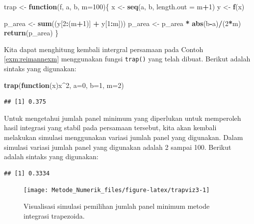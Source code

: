 \documentclass[]{book}
\newenvironment{Shaded}{\begin{snugshade}}{\end{snugshade}}
\newcommand{\ControlFlowTok}[1]{\textcolor[rgb]{0.13,0.29,0.53}{\textbf{#1}}}
\newcommand{\DataTypeTok}[1]{\textcolor[rgb]{0.13,0.29,0.53}{#1}}
\newcommand{\DecValTok}[1]{\textcolor[rgb]{0.00,0.00,0.81}{#1}}
\newcommand{\KeywordTok}[1]{\textcolor[rgb]{0.13,0.29,0.53}{\textbf{#1}}}
\newcommand{\NormalTok}[1]{#1}
\newcommand{\OperatorTok}[1]{\textcolor[rgb]{0.81,0.36,0.00}{\textbf{#1}}}
\newcommand{\StringTok}[1]{\textcolor[rgb]{0.31,0.60,0.02}{#1}}
\theoremstyle{definition}
\theoremstyle{definition}
\theoremstyle{definition}
\theoremstyle{remark}
\begin{document}
\begin{Shaded}
\begin{Highlighting}[]
\NormalTok{trap <-}\StringTok{ }\ControlFlowTok{function}\NormalTok{(f, a, b, }\DataTypeTok{m=}\DecValTok{100}\NormalTok{)\{}
\NormalTok{  x <-}\StringTok{ }\KeywordTok{seq}\NormalTok{(a, b, }\DataTypeTok{length.out =}\NormalTok{ m}\OperatorTok{+}\DecValTok{1}\NormalTok{)}
\NormalTok{  y <-}\StringTok{ }\KeywordTok{f}\NormalTok{(x)}
  
\NormalTok{  p_area <-}\StringTok{ }\KeywordTok{sum}\NormalTok{((y[}\DecValTok{2}\OperatorTok{:}\NormalTok{(m}\OperatorTok{+}\DecValTok{1}\NormalTok{)] }\OperatorTok{+}\StringTok{ }\NormalTok{y[}\DecValTok{1}\OperatorTok{:}\NormalTok{m])) }
\NormalTok{  p_area <-}\StringTok{ }\NormalTok{p_area }\OperatorTok{*}\StringTok{ }\KeywordTok{abs}\NormalTok{(b}\OperatorTok{-}\NormalTok{a)}\OperatorTok{/}\NormalTok{(}\DecValTok{2}\OperatorTok{*}\NormalTok{m)}
  \KeywordTok{return}\NormalTok{(p_area)}
\NormalTok{\}}
\end{Highlighting}
\end{Shaded}

Kita dapat menghitung kembali intergral persamaan pada Contoh \ref{exm:reimannexm} menggunakan fungsi \texttt{trap()} yang telah dibuat. Berikut adalah sintaks yang digunakan:

\begin{Shaded}
\begin{Highlighting}[]
\KeywordTok{trap}\NormalTok{(}\ControlFlowTok{function}\NormalTok{(x)x}\OperatorTok{^}\DecValTok{2}\NormalTok{, }\DataTypeTok{a=}\DecValTok{0}\NormalTok{, }\DataTypeTok{b=}\DecValTok{1}\NormalTok{, }\DataTypeTok{m=}\DecValTok{2}\NormalTok{)}
\end{Highlighting}
\end{Shaded}

\begin{verbatim}
## [1] 0.375
\end{verbatim}

Untuk mengetahui jumlah panel minimum yang diperlukan untuk memperoleh hasil integrasi yang stabil pada persamaan tersebut, kita akan kembali melakukan simulasi menggunakan variasi jumlah panel yang digunakan. Dalam simulasi variasi jumlah panel yang digunakan adalah 2 sampai 100. Berikut adalah sintaks yang digunakan:

\begin{verbatim}
## [1] 0.3334
\end{verbatim}

\begin{figure}

{\centering \texttt{[image: Metode\_Numerik\_files/figure-latex/trapviz3-1]} 

}

\caption{Visualisasi simulasi pemilihan jumlah panel minimum metode integrasi trapezoida.}\label{fig:trapviz3}
\end{figure}
\end{document}
